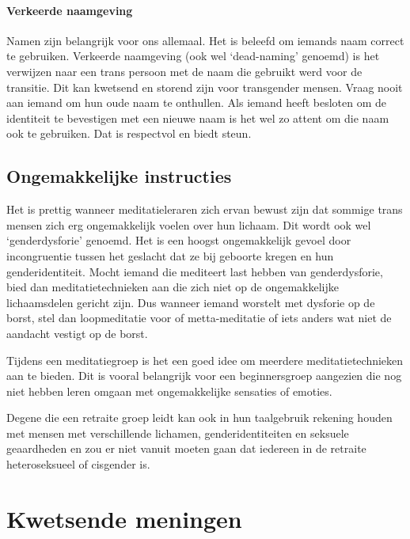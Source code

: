 \documentclass[12pt,openany]{book}
\begin{document}
\subsubsection*{Verkeerde naamgeving}

Namen zijn belangrijk voor ons allemaal. Het is beleefd om iemands naam correct te gebruiken. Verkeerde naamgeving (ook wel ‘dead-naming’ genoemd) is het verwijzen naar een trans persoon met de naam die gebruikt werd voor de transitie. Dit kan kwetsend en storend zijn voor transgender mensen. Vraag nooit aan iemand om hun oude naam te onthullen. Als iemand heeft besloten om de identiteit te bevestigen met een nieuwe naam is het wel zo attent om die naam ook te gebruiken. Dat is respectvol en biedt steun. 

\section*{Ongemakkelijke instructies}

Het is prettig wanneer meditatieleraren zich ervan bewust zijn dat sommige trans mensen zich erg ongemakkelijk voelen over hun lichaam. Dit wordt ook wel ‘genderdysforie’ genoemd. Het is een hoogst ongemakkelijk gevoel door incongruentie tussen het geslacht dat ze bij geboorte kregen en hun genderidentiteit. Mocht iemand die mediteert last hebben van genderdysforie, bied dan meditatietechnieken aan die zich niet op de ongemakkelijke lichaamsdelen gericht zijn. Dus wanneer iemand worstelt met dysforie op de borst, stel dan loopmeditatie voor of metta-meditatie of iets anders wat niet de aandacht vestigt op de borst.

Tijdens een meditatiegroep is het een goed idee om meerdere meditatietechnieken aan te bieden. Dit is vooral belangrijk voor een beginnersgroep aangezien die nog niet hebben leren omgaan met ongemakkelijke sensaties of emoties.

Degene die een retraite groep leidt kan ook in hun taalgebruik rekening houden met mensen met verschillende lichamen, genderidentiteiten en seksuele geaardheden en zou er niet vanuit moeten gaan dat iedereen in de retraite heteroseksueel of cisgender is.



\chapter*{Kwetsende meningen}
\end{document}
